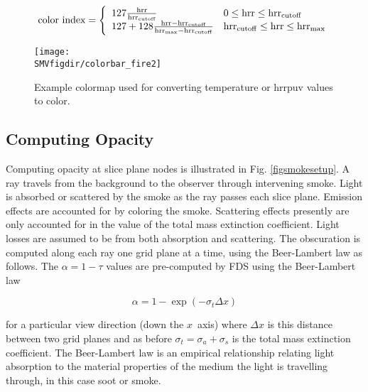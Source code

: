 {\begin{eqnarray}
\mbox{color index}=\left\{
\begin{array}{ll}
  127\frac{{\rm hrr}}{{\rm hrr}_{\rm cutoff}} & 0 \le {\rm hrr} \le {\rm hrr}_{\rm cutoff} \\
  127 + 128\frac{{\rm hrr}-{\rm hrr}_{\rm cutoff}}{{\rm hrr}_{\rm max}-{\rm hrr}_{\rm cutoff}} & {\rm hrr}_{\rm cutoff} \le {\rm hrr} \le {\rm hrr}_{\rm max}
\end{array}
\right.
\end{eqnarray}

\begin{figure}[bph]
\begin{center}
\texttt{[image: \\SMVfigdir/colorbar\_fire2]}
\end{center}
\caption[Example colormap used for converting temperature or hrrpuv values to color.]
{Example colormap used for converting temperature or hrrpuv values to color.}
\label{fig:colormaps}
\end{figure}


\subsection{Computing Opacity}
Computing opacity at slice plane nodes is illustrated in Fig.
\ref{figsmokesetup}. A ray travels from the background to the
observer through intervening smoke. Light is absorbed or scattered
by the smoke as the ray passes each slice plane. Emission effects
are accounted for by coloring the smoke.  Scattering effects
presently are only accounted for in the value of the total mass
extinction coefficient.  Light losses are assumed to be from both
absorption and scattering. The obscuration is computed along each
ray one grid plane at a time, using the Beer-Lambert law as
follows.  The $\alpha=1-\tau$ values are pre-computed by FDS using
the Beer-Lambert law~\cite{Siegel:2001}

\begin{equation}
\label{eq:alpha}
\alpha=1-\exp(-\sigma_t\Delta x)
\end{equation}

\noindent for a particular view direction (down the $x$~axis)
where $\Delta x$ is this distance between two grid planes and as
before $\sigma_t=\sigma_a+\sigma_s$ is the total mass extinction
coefficient.  The Beer-Lambert law is an empirical relationship
relating light absorption to the material properties of the medium
the light is travelling through, in this case soot or smoke.

}
